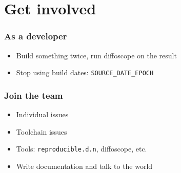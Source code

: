 \documentclass[14pt,aspectratio=169]{beamer}
\begin{document}
\section{Get involved}

\begin{frame}
 \frametitle{As a developer} \pause
 \begin{itemize}
  \item Build something twice, run diffoscope on the result \pause
  \item Stop using build dates: \texttt{SOURCE\_DATE\_EPOCH}
 \end{itemize}
\end{frame}

\begin{frame}
 \frametitle{Join the team} \pause

 \begin{itemize}
   \item Individual issues \pause
   \item Toolchain issues \pause
   \item Tools: \texttt{reproducible.d.n}, diffoscope, etc. \pause
   \item Write documentation and talk to the world
 \end{itemize}
\end{frame}

\end{document}
